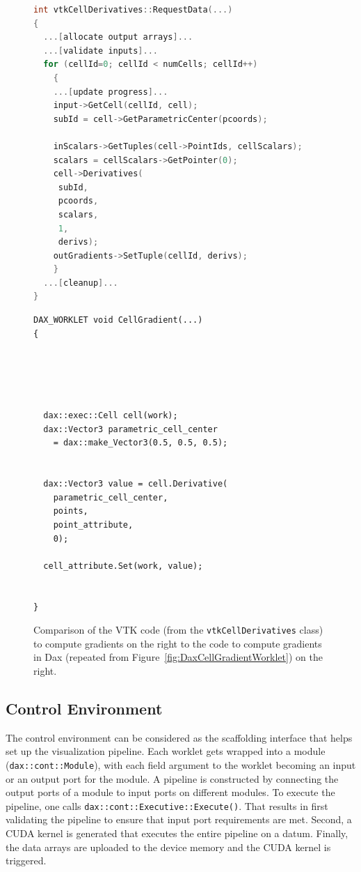 \documentclass{vgtc}                          %
\newcommand*{\textC}[1]{\texttt{#1}}
\begin{document}
\begin{figure}
  \centering
  \begin{minipage}[t]{.49\linewidth}
    \begin{lstlisting}[language=C++]
int vtkCellDerivatives::RequestData(...)
{
  ...[allocate output arrays]...
  ...[validate inputs]...
  for (cellId=0; cellId < numCells; cellId++)
    {
    ...[update progress]...
    input->GetCell(cellId, cell);
    subId = cell->GetParametricCenter(pcoords);

    inScalars->GetTuples(cell->PointIds, cellScalars);
    scalars = cellScalars->GetPointer(0);
    cell->Derivatives(
     subId,
     pcoords,
     scalars,
     1,
     derivs);
    outGradients->SetTuple(cellId, derivs);
    }
  ...[cleanup]...
}
    \end{lstlisting}
  \end{minipage}
  \begin{minipage}[t]{.49\linewidth}
    \begin{lstlisting}[language=Dax]
DAX_WORKLET void CellGradient(...)
{





  dax::exec::Cell cell(work);
  dax::Vector3 parametric_cell_center
    = dax::make_Vector3(0.5, 0.5, 0.5);
 

  dax::Vector3 value = cell.Derivative(
    parametric_cell_center,
    points,
    point_attribute,
    0);

  cell_attribute.Set(work, value);


}
    \end{lstlisting}
  \end{minipage}
  \caption{Comparison of the VTK code (from the \textC{vtkCellDerivatives}
    class) to compute gradients on the right to the code to compute
    gradients in Dax (repeated from
    Figure~\ref{fig:DaxCellGradientWorklet}) on the right.}
  \label{fig:DaxVTKCompare}
\end{figure}

\subsection{Control Environment}
\label{sec:ControlEnvironment}

The control environment can be considered as the scaffolding interface that helps set up the
visualization pipeline. Each worklet gets wrapped into a module (\textC{dax::cont::Module}),
with each field argument to the worklet becoming an input or an output port for
the module. A pipeline is constructed by connecting the output ports of a module to input
ports on different modules. To execute the pipeline, one calls
\textC{dax::cont::Executive::Execute()}. That results in first validating the pipeline to ensure
that input port requirements are met. Second, a CUDA kernel is generated that
executes the entire pipeline on a datum. Finally, the data arrays are
uploaded to the device memory and the CUDA kernel is triggered.
\end{document}

